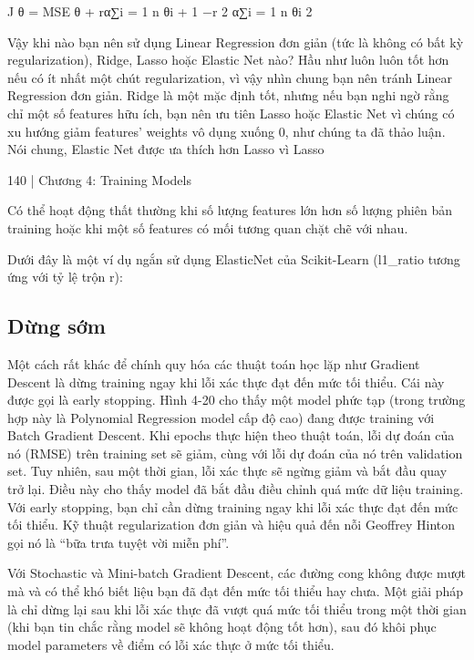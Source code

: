 J θ = MSE θ + rα∑i = 1 n θi + 1 −r 2 α∑i = 1 n θi 2

Vậy khi nào bạn nên sử dụng Linear Regression đơn giản (tức là không có bất kỳ regularization), Ridge, Lasso hoặc Elastic Net nào? Hầu như luôn luôn tốt hơn nếu có ít nhất một chút regularization, vì vậy nhìn chung bạn nên tránh Linear Regression đơn giản. Ridge là một mặc định tốt, nhưng nếu bạn nghi ngờ rằng chỉ một số features hữu ích, bạn nên ưu tiên Lasso hoặc Elastic Net vì chúng có xu hướng giảm features’ weights vô dụng xuống 0, như chúng ta đã thảo luận. Nói chung, Elastic Net được ưa thích hơn Lasso vì Lasso

140 | Chương 4: Training Models

Có thể hoạt động thất thường khi số lượng features lớn hơn số lượng phiên bản training hoặc khi một số features có mối tương quan chặt chẽ với nhau.

Dưới đây là một ví dụ ngắn sử dụng ElasticNet của Scikit-Learn (l1\_ratio tương ứng với tỷ lệ trộn r):

\subsection{Dừng sớm}

Một cách rất khác để chính quy hóa các thuật toán học lặp như Gradient Descent là dừng training ngay khi lỗi xác thực đạt đến mức tối thiểu. Cái này được gọi là early stopping. Hình 4-20 cho thấy một model phức tạp (trong trường hợp này là Polynomial Regression model cấp độ cao) đang được training với Batch Gradient Descent. Khi epochs thực hiện theo thuật toán, lỗi dự đoán của nó (RMSE) trên training set sẽ giảm, cùng với lỗi dự đoán của nó trên validation set. Tuy nhiên, sau một thời gian, lỗi xác thực sẽ ngừng giảm và bắt đầu quay trở lại. Điều này cho thấy model đã bắt đầu điều chỉnh quá mức dữ liệu training. Với early stopping, bạn chỉ cần dừng training ngay khi lỗi xác thực đạt đến mức tối thiểu. Kỹ thuật regularization đơn giản và hiệu quả đến nỗi Geoffrey Hinton gọi nó là “bữa trưa tuyệt vời miễn phí”.

Với Stochastic và Mini-batch Gradient Descent, các đường cong không được mượt mà và có thể khó biết liệu bạn đã đạt đến mức tối thiểu hay chưa. Một giải pháp là chỉ dừng lại sau khi lỗi xác thực đã vượt quá mức tối thiểu trong một thời gian (khi bạn tin chắc rằng model sẽ không hoạt động tốt hơn), sau đó khôi phục model parameters về điểm có lỗi xác thực ở mức tối thiểu.

